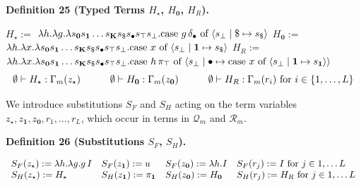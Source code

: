 \documentclass[10pt,a4paper]{amsart}
\begin{document}
\par\medskip\noindent\textbf{Definition 25 (Typed Terms $H_{\star}$, $H_{\mathbf{0}}$, $H_{R}$).}\par
 
    $\displaystyle H_{\star}:=$ $\displaystyle\lambda h.\lambda g.\lambda s_{\mathbf{0}}s_{\mathbf{1}}\ldots s_%
{\mathbf{K}}s_{\$}s_{\bullet}s_{\top}s_{\bot}.\textnormal{{case }}{g\,\delta_{%
\bullet}}\textnormal{{ of }}\langle s_{\bot}\mid\$\mapsto s_{\$}\rangle$     $\displaystyle H_{\mathbf{0}}:=$ $\displaystyle\lambda h.\lambda x.\lambda s_{\mathbf{0}}s_{\mathbf{1}}\ldots s_%
{\mathbf{K}}s_{\$}s_{\bullet}s_{\top}s_{\bot}.\textnormal{{case }}{x}%
\textnormal{{ of }}\langle s_{\bot}\mid\mathbf{1}\mapsto s_{\$}\rangle$     $\displaystyle H_{R}:=$ $\displaystyle\lambda h.\lambda x.\lambda s_{\mathbf{0}}s_{\mathbf{1}}\ldots s_%
{\mathbf{K}}s_{\$}s_{\bullet}s_{\top}s_{\bot}.\textnormal{{case }}{h\,\pi_{%
\top}}\textnormal{{ of }}\langle s_{\bot}\mid\bullet\mapsto\textnormal{{case }%
}{x}\textnormal{{ of }}\langle s_{\bot}\mid\mathbf{1}\mapsto s_{\mathbf{1}}\rangle\rangle$       \[\emptyset\vdash H_{\star}:\Gamma_{m}(z_{\star})\qquad\quad\emptyset\vdash H_{%
\mathbf{0}}:\Gamma_{m}(z_{\mathbf{0}})\qquad\quad\emptyset\vdash H_{R}:\Gamma_%
{m}(r_{i})\text{ for }i\in\{1,\ldots,L\}\]    
 
 
 
We introduce substitutions $S_{F}$ and $S_{H}$ acting on the term variables $z_{\star},z_{\mathbf{1}},z_{\mathbf{0}},r_{1},\ldots,r_{L}$, which occur in terms in $\mathcal{Q}_{m}$ and $\mathcal{R}_{m}$.\par
 
 
 
\par\medskip\noindent\textbf{Definition 26 (Substitutions $S_{F}$, $S_{H}$).}\par
 
    \[\begin{array}[]{llll}S_{F}(z_{\star}):=\lambda h.\lambda g.g\,I\nobreak%
\leavevmode&S_{F}(z_{\mathbf{1}}):=u\nobreak\leavevmode&S_{F}(z_{\mathbf{0}}):%
=\lambda h.I\nobreak\leavevmode&S_{F}(r_{j}):=I\text{ for }j\in{1,\ldots L}\\
S_{H}(z_{\star}):=H_{\star}&S_{H}(z_{\mathbf{1}}):=\pi_{\mathbf{1}}&S_{H}(z_{%
\mathbf{0}}):=H_{\mathbf{0}}&S_{H}(r_{j}):=H_{R}\text{ for }j\in{1,\ldots L}%
\end{array}\]    
 
\end{document}
